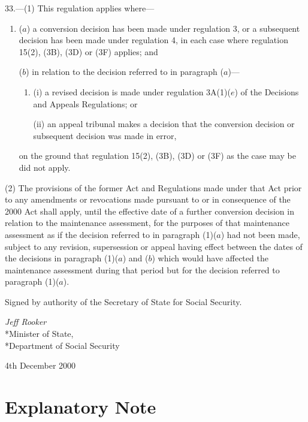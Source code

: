 \documentclass[12pt,a4paper]{article}
\begin{document}
33.---(1)  This regulation applies where—
\begin{enumerate}\item[]
($a$) a conversion decision has been made under regulation 3, or a subsequent decision has been made under regulation 4, in each case where regulation 
15(2), (3B), (3D) or (3F)  %
applies; and

($b$) in relation to the decision referred to in paragraph ($a$)—
\begin{enumerate}\item[]
(i) a revised decision is made under regulation 3A(1)($e$)  of the Decisions and Appeals Regulations; or

(ii) an appeal tribunal makes a decision that the conversion decision or subsequent decision was made in error,
\end{enumerate}
on the ground that regulation 
15(2), (3B), (3D) or (3F) as the case may be  %
did not apply.
\end{enumerate}

(2) The provisions of the former Act and Regulations made under that Act prior to any amendments or revocations made pursuant to or in consequence of the 2000 Act shall apply, until the effective date of a further conversion decision in relation to the maintenance assessment, for the purposes of that maintenance assessment as if the decision referred to in paragraph (1)($a$)  had not been made, subject to any revision, supersession or appeal having effect between the dates of the decisions in paragraph (1)($a$)  and ($b$)  which would have affected the maintenance assessment during that period but for the decision referred to paragraph (1)($a$). 


\bigskip

Signed 
by authority of the Secretary of State for Social Security.

{\raggedleft
\emph{Jeff Rooker}\\*Minister of State,\\*Department of Social Security

}

4th December 2000

\small

\part{Explanatory Note}
\end{document}
